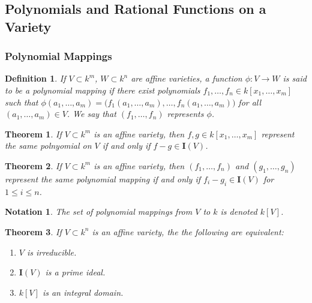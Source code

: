 \documentclass[oneside]{book}
\theoremstyle{mystyle}
\newtheorem{theorem}{Theorem}[section]
\newtheorem{definition}{Definition}[section]
\newtheorem{notation}{Notation}[section]
\begin{document}
\subsection{Polynomials and Rational Functions on a Variety}
\subsubsection{Polynomial Mappings}
\begin{definition}
If $V\subset k^m$, $W\subset k^n$ are affine varieties, a function $\phi:V\rightarrow W$ is said to be a polynomial mapping if there exist polynomials $f_1,\hdots, f_n\in k[x_1,\hdots, x_m]$ such that $\phi(a_1,\hdots, a_m) = \big(f_1(a_1,\hdots, a_m),\hdots, f_n(a_1,\hdots, a_m)\big)$ for all $(a_1,\hdots, a_m) \in V$. We say that $(f_1,\hdots, f_n)$ represents $\phi$.
\end{definition}
\begin{theorem}
If $V\subset k^m$ is an affine variety, then $f,g\in k[x_1,\hdots, x_m]$ represent the same polnyomial on $V$ if and only if $f-g \in \textbf{I}(V)$.
\end{theorem}
\begin{theorem}
If $V\subset k^m$ is an affine variety, then $(f_1,\hdots, f_n)$ and $(g_1,\hdots, g_n)$ represent the same polynomial mapping if and only if $f_i-g_i \in \textbf{I}(V)$ for $1\leq i \leq n$.
\end{theorem}
\begin{notation}
The set of polynomial mappings from $V$ to $k$ is denoted $k[V]$.
\end{notation}
\begin{theorem}
If $V\subset k^n$ is an affine variety, the the following are equivalent:
\begin{enumerate}
    \item $V$ is irreducible.
    \item $\textbf{I}(V)$ is a prime ideal.
    \item $k[V]$ is an integral domain.
\end{enumerate}
\end{theorem}
\end{document}
